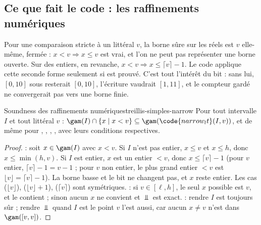 \subsection{Ce que fait le code : les raffinements numériques}


Pour une comparaison stricte à un littéral $v$, la borne sûre sur les réels
est $v$ elle-même, fermée : $x < v \Rightarrow x \le v$ est vrai, et l'on ne
peut pas représenter une borne ouverte. Sur des entiers, en revanche,
$x < v \Rightarrow x \le \lceil v \rceil - 1$. Le code applique cette
seconde forme seulement si  est prouvé. C'est tout l'intérêt
du bit : sans lui, $[0,10]$ sous  resterait $[0,10]$,
l'écriture vaudrait $[1,11]$, et le compteur gardé ne convergerait pas vers
une borne finie.

\begin{theoreme}{Soundness des raffinements numériques}{treillis-simples-narrow}
  Pour tout intervalle $I$ et tout littéral $v$ :
  $\gam(I) \cap \{x \mid x < v\} \subseteq \gam(\code{narrow_lt}(I, v))$,
  et de même pour , , ,
  ,  avec leurs conditions respectives.
\end{theoreme}
\begin{proof}
   : soit $x \in \gam(I)$ avec $x < v$. Si $I$ n'est pas
  entier, $x \le v$ et $x \le h$, donc $x \le \min(h, v)$. Si $I$ est
  entier, $x$ est un entier $< v$, donc $x \le \lceil v \rceil - 1$ (pour
  $v$ entier, $\lceil v \rceil - 1 = v - 1$ ; pour $v$ non entier, le plus
  grand entier $< v$ est $\lfloor v \rfloor = \lceil v \rceil - 1$). La
  borne basse et le bit ne changent pas, et $x$ reste entier. Les cas
   ($\lfloor v \rfloor$), 
  ($\lfloor v \rfloor + 1$),  ($\lceil v \rceil$) sont
  symétriques.  : si $v \in [\ell, h]$, le seul $x$ possible
  est $v$, et  le contient ; sinon aucun $x$ ne convient et
  $\Bot$ est exact.  : rendre $I$ est toujours sûr ; rendre
  $\Bot$ quand $I$ est le point $v$ l'est aussi, car aucun $x \neq v$ n'est
  dans $\gam([v,v])$.
\end{proof}


